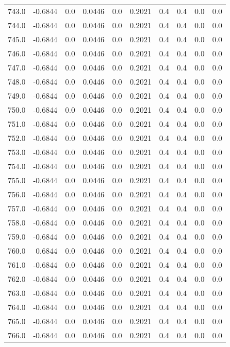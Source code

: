 \begin{longtable}{lrrrrrrrrr}
743.0 & -0.6844 & 0.0 & 0.0446 & 0.0 & 0.2021 & 0.4 & 0.4 & 0.0 & 0.0 \\
744.0 & -0.6844 & 0.0 & 0.0446 & 0.0 & 0.2021 & 0.4 & 0.4 & 0.0 & 0.0 \\
745.0 & -0.6844 & 0.0 & 0.0446 & 0.0 & 0.2021 & 0.4 & 0.4 & 0.0 & 0.0 \\
746.0 & -0.6844 & 0.0 & 0.0446 & 0.0 & 0.2021 & 0.4 & 0.4 & 0.0 & 0.0 \\
747.0 & -0.6844 & 0.0 & 0.0446 & 0.0 & 0.2021 & 0.4 & 0.4 & 0.0 & 0.0 \\
748.0 & -0.6844 & 0.0 & 0.0446 & 0.0 & 0.2021 & 0.4 & 0.4 & 0.0 & 0.0 \\
749.0 & -0.6844 & 0.0 & 0.0446 & 0.0 & 0.2021 & 0.4 & 0.4 & 0.0 & 0.0 \\
750.0 & -0.6844 & 0.0 & 0.0446 & 0.0 & 0.2021 & 0.4 & 0.4 & 0.0 & 0.0 \\
751.0 & -0.6844 & 0.0 & 0.0446 & 0.0 & 0.2021 & 0.4 & 0.4 & 0.0 & 0.0 \\
752.0 & -0.6844 & 0.0 & 0.0446 & 0.0 & 0.2021 & 0.4 & 0.4 & 0.0 & 0.0 \\
753.0 & -0.6844 & 0.0 & 0.0446 & 0.0 & 0.2021 & 0.4 & 0.4 & 0.0 & 0.0 \\
754.0 & -0.6844 & 0.0 & 0.0446 & 0.0 & 0.2021 & 0.4 & 0.4 & 0.0 & 0.0 \\
755.0 & -0.6844 & 0.0 & 0.0446 & 0.0 & 0.2021 & 0.4 & 0.4 & 0.0 & 0.0 \\
756.0 & -0.6844 & 0.0 & 0.0446 & 0.0 & 0.2021 & 0.4 & 0.4 & 0.0 & 0.0 \\
757.0 & -0.6844 & 0.0 & 0.0446 & 0.0 & 0.2021 & 0.4 & 0.4 & 0.0 & 0.0 \\
758.0 & -0.6844 & 0.0 & 0.0446 & 0.0 & 0.2021 & 0.4 & 0.4 & 0.0 & 0.0 \\
759.0 & -0.6844 & 0.0 & 0.0446 & 0.0 & 0.2021 & 0.4 & 0.4 & 0.0 & 0.0 \\
760.0 & -0.6844 & 0.0 & 0.0446 & 0.0 & 0.2021 & 0.4 & 0.4 & 0.0 & 0.0 \\
761.0 & -0.6844 & 0.0 & 0.0446 & 0.0 & 0.2021 & 0.4 & 0.4 & 0.0 & 0.0 \\
762.0 & -0.6844 & 0.0 & 0.0446 & 0.0 & 0.2021 & 0.4 & 0.4 & 0.0 & 0.0 \\
763.0 & -0.6844 & 0.0 & 0.0446 & 0.0 & 0.2021 & 0.4 & 0.4 & 0.0 & 0.0 \\
764.0 & -0.6844 & 0.0 & 0.0446 & 0.0 & 0.2021 & 0.4 & 0.4 & 0.0 & 0.0 \\
765.0 & -0.6844 & 0.0 & 0.0446 & 0.0 & 0.2021 & 0.4 & 0.4 & 0.0 & 0.0 \\
766.0 & -0.6844 & 0.0 & 0.0446 & 0.0 & 0.2021 & 0.4 & 0.4 & 0.0 & 0.0 \\

\end{longtable}
